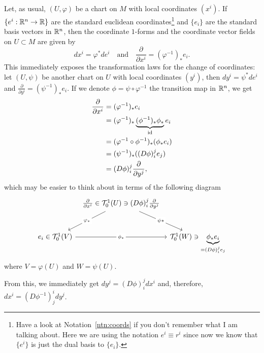 \begin{example}
  Let, as usual, $(U,\varphi)$ be a chart on $M$ with local coordinates $(x^i)$.
  If $\{e^i:\mathbb{R}^n\to\mathbb{R}\}$ are the standard euclidean coordinates\footnote{Have a look at Notation~\ref{ntn:coords} if you don't remember what I am talking about.
    Here we are using the notation $e^i \equiv r^i$ since now we know that $\{e^i\}$ is just the dual basis to $\{e_i\}$. } and $\{e_i\}$ are the standard basis vectors in $\mathbb{R}^n$, then the coordinate $1$-forms and the coordinate vector fields on $U\subset M$ are given by
  \begin{equation}
    dx^i = \varphi^* de^i
    \quad\mbox{and}\quad
    \frac{\partial}{\partial x^i} = (\varphi^{-1})_* e_i.
  \end{equation}
  This immediately exposes the transformation laws for the change of coordinates: let $(U, \psi)$ be another chart on $U$ with local coordinates $(y^i)$, then $dy^i = \psi^* de^i$ and $\frac{\partial}{\partial y^i} = (\psi^{-1})_* e_i$. If we denote $\phi = \psi\circ\varphi^{-1}$ the transition map in $\mathbb{R}^n$, we get
  \begin{align}
    \frac{\partial}{\partial x^i} & = (\varphi^{-1})_* e_i                                             \\
                                  & = (\varphi^{-1})_* \LaTeXunderbrace{(\phi^{-1})_*\phi_*}_{\id} e_i \\
                                  & = (\varphi^{-1}\circ \phi^{-1})_* (\phi_* e_i)                     \\
                                  & = (\psi^{-1})_* ((D\phi)_i^j e_j)                                  \\
                                  & = (D\phi)_i^j \frac{\partial}{\partial y^j},
  \end{align}
  which may be easier to think about in terms of the following diagram
  \begin{equation}\nonumber
    \begin{tikzcd}[row sep=large, column sep=tiny]
      & \frac{\partial}{\partial x^i} \in \cT_0^1(U) \ni (D\phi)_i^j \frac{\partial}{\partial y^j} \arrow[dl, "\varphi_*" description] \arrow[dr, "\psi*" description] & \\
      e_i \in \cT_0^1(V) \arrow[rr, "\phi_*" description] & & \cT_0^1(W) \ni \LaTeXunderbrace{\phi_* e_i}_{= (D\phi)_i^j e_j}
    \end{tikzcd}
  \end{equation}
  where $V = \varphi(U)$ and $W = \psi(U)$.

  From this, we immediately get $dy^j = (D\phi)_i^j dx^i$ and, therefore, $dx^i =  (D\phi^{-1})_j^i dy^j$.
\end{example}

